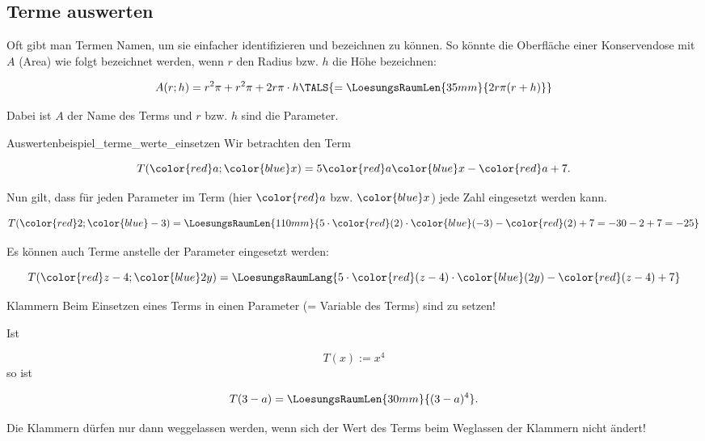 

\subsection{Terme auswerten}
Oft gibt man Termen Namen, um sie einfacher identifizieren und
bezeichnen zu können. So könnte \zB die Oberfläche einer
Konservendose mit $A$ (Area) wie folgt bezeichnet werden, wenn $r$ den
Radius bzw. $h$ die Höhe bezeichnen:

$$A(r; h) = r^2\pi + r^2\pi + 2r\pi{}\cdot{}h \TALS{ = \LoesungsRaumLen{35mm}{2r\pi(r+h)}}$$

Dabei ist $A$ der Name des Terms und $r$ bzw. $h$ sind die Parameter.
\vspace{3mm}
\begin{beispiel}{Auswerten}{beispiel_terme_werte_einsetzen}
  Wir betrachten den Term

  $$T({\color{red}a}; {\color{blue}x}) = 5{\color{red}a}{\color{blue}x} - {\color{red}a} + 7.$$

  Nun gilt, dass für jeden Parameter im Term (hier ${\color{red}a}$
  bzw. ${\color{blue}x}$) jede Zahl eingesetzt
  werden kann.\leserluft{}

  $$T({\color{red}2}; {\color{blue}-3}) =
  \LoesungsRaumLen{110mm}{5\cdot{}{\color{red}(2)}\cdot{\color{blue}(-3)} -
    {\color{red}(2)} + 7 = -30  - 2 + 7 = -25}$$

  Es können auch Terme anstelle der Parameter eingesetzt
  werden:\leserluft{}

  $$T({\color{red}z-4}; {\color{blue}2y}) =
  \LoesungsRaumLang{5 \cdot{} {\color{red}(z-4)} \cdot {\color{blue}(2y)} - {\color{red}(z-4)} + 7}$$
\end{beispiel}

\begin{gesetz}{Klammern}{}
  Beim Einsetzen eines Terms in einen
  Parameter (= Variable des Terms) sind  zu setzen!

  Ist
  
  $$ T(x) := x^4$$
  so ist
  
  $$ T(3-a) = \LoesungsRaumLen{30mm}{(3-a)^4}.$$
  
Die Klammern dürfen nur dann weggelassen werden, wenn sich der Wert
des Terms beim Weglassen der Klammern nicht ändert!
\end{gesetz}
\newpage

